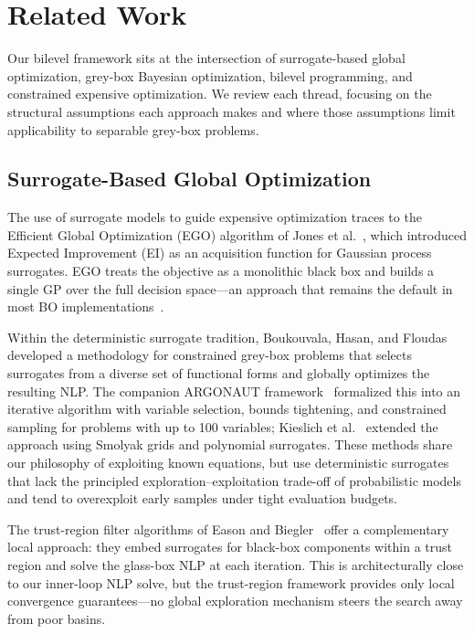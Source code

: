 \documentclass[12pt,a4paper]{article}%
\theoremstyle{plain}%
\theoremstyle{remark}%
\theoremstyle{definition}%
\begin{document}
\section{Related Work}\label{sec:related_work}

Our bilevel framework sits at the intersection of surrogate-based global optimization, grey-box Bayesian optimization, bilevel programming, and constrained expensive optimization. We review each thread, focusing on the structural assumptions each approach makes and where those assumptions limit applicability to separable grey-box problems.

\subsection{Surrogate-Based Global Optimization}

The use of surrogate models to guide expensive optimization traces to the Efficient Global Optimization (EGO) algorithm of Jones et al.~\cite{jones1998efficient}, which introduced Expected Improvement (EI) as an acquisition function for Gaussian process surrogates. EGO treats the objective as a monolithic black box and builds a single GP over the full decision space---an approach that remains the default in most BO implementations~\cite{shahriari2016bo_survey,frazier2018tutorial}.

Within the deterministic surrogate tradition, Boukouvala, Hasan, and Floudas~\cite{boukouvala2017greybox_jgo} developed a methodology for constrained grey-box problems that selects surrogates from a diverse set of functional forms and globally optimizes the resulting NLP. The companion ARGONAUT framework~\cite{boukouvala2017argonaut} formalized this into an iterative algorithm with variable selection, bounds tightening, and constrained sampling for problems with up to 100 variables; Kieslich et al.~\cite{kieslich2018smolyak} extended the approach using Smolyak grids and polynomial surrogates. These methods share our philosophy of exploiting known equations, but use deterministic surrogates that lack the principled exploration--exploitation trade-off of probabilistic models and tend to overexploit early samples under tight evaluation budgets.

The trust-region filter algorithms of Eason and Biegler~\cite{eason2016trf,eason2018trf} offer a complementary local approach: they embed surrogates for black-box components within a trust region and solve the glass-box NLP at each iteration. This is architecturally close to our inner-loop NLP solve, but the trust-region framework provides only local convergence guarantees---no global exploration mechanism steers the search away from poor basins.
\end{document}
